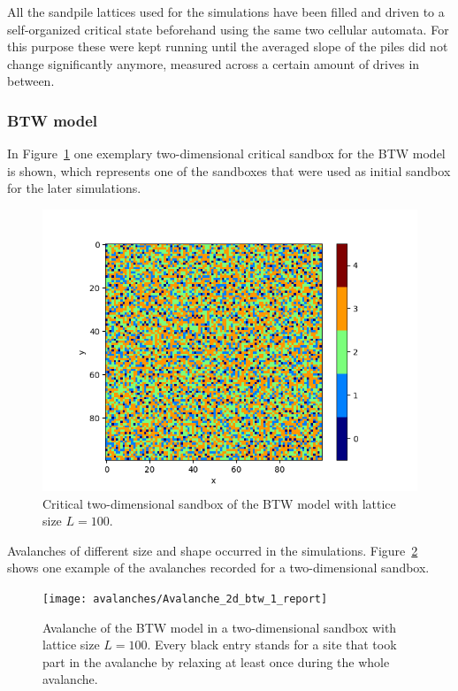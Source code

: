 All the sandpile lattices used for the simulations have been filled and driven to a self-organized critical state
beforehand using the same two cellular automata. For this purpose these were kept running until the averaged slope of
the piles did not change significantly anymore, measured across a certain amount of drives in between.

\subsubsection{BTW model}
In Figure~\ref{fig:btwSandbox} one exemplary two-dimensional critical sandbox for the BTW model is shown,
which represents one of the sandboxes that were used as initial sandbox for the later simulations.
\begin{figure}[htb]
    \centering
    \includegraphics[width=\linewidth]{plots/sandboxes/BTW_100x100}
    \caption{Critical two-dimensional sandbox of the BTW model with lattice size $L=100$.}
    \label{fig:btwSandbox}
\end{figure}

Avalanches of different size and shape occurred in the simulations. Figure~\ref{fig:btw2DAvalanche} shows one example
of the avalanches recorded for a two-dimensional sandbox.
\begin{figure}[htb]
    \centering
    \texttt{[image: avalanches/Avalanche\_2d\_btw\_1\_report]}
    \caption{Avalanche of the BTW model in a two-dimensional sandbox with lattice size $L=100$.
             Every black entry stands for a site that took part in the avalanche by relaxing
             at least once during the whole avalanche.}
    \label{fig:btw2DAvalanche}
\end{figure}

